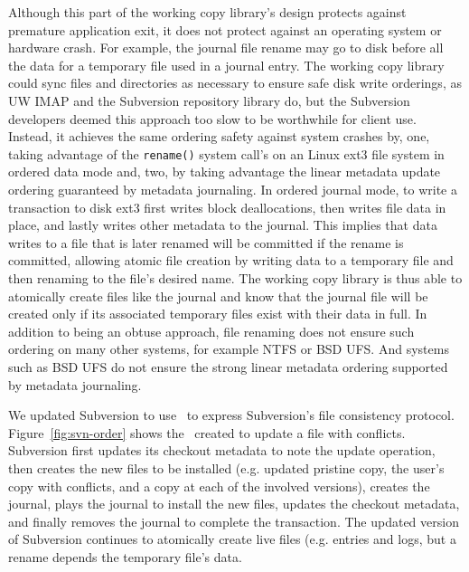 Although this part of the working copy library's design protects
against premature application exit, it does not protect against an
operating system or hardware crash. For example, the journal file
rename may go to disk before all the data for a temporary file used in
a journal entry.
%
The working copy library could sync files and directories as necessary
to ensure safe disk write orderings, as UW IMAP and the Subversion
repository library do, but the Subversion developers deemed this
approach too slow to be worthwhile for client use.
%
Instead, it achieves the same ordering safety against system crashes
by,
%
one, taking advantage of the \texttt{rename()} system call's on an
Linux ext3 file system in ordered data mode and,
%
two, by taking advantage the linear metadata update ordering
guaranteed by metadata journaling.
%
In ordered journal mode, to write a transaction to disk ext3 first
writes block deallocations, then writes
file data in place, and lastly writes other metadata to the journal.
This implies that data writes to a file that is later renamed will be
committed if the rename is committed, allowing atomic file creation by
writing data to a temporary file and then renaming to the file's
desired name.
%
The working copy library is thus able to atomically create files like the
journal and know that the journal file will be created only if its
associated temporary files exist with their data in full.
%
In addition to being an obtuse approach, file renaming does not
ensure such ordering on many other systems, for example NTFS or BSD UFS.
And systems such as BSD UFS do not ensure the strong linear metadata
ordering supported by metadata journaling.
%

We updated Subversion to use \opgroups\ to express Subversion's file
consistency protocol.
Figure~\ref{fig:svn-order} shows the \opgroups\ created to update a
file with conflicts.
%
Subversion first updates its checkout metadata to note the update
operation, then creates the new files to be installed (e.g. updated
pristine copy, the user's copy with conflicts, and a copy at each of
the involved versions), creates the journal, plays the journal to
install the new files, updates the checkout metadata, and finally
removes the journal to complete the transaction.
%
The updated version of Subversion continues to atomically create live
files (e.g. entries and logs, but a rename depends the temporary
file's data.

